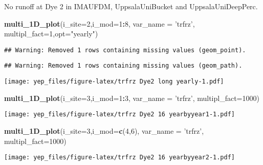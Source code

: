 \documentclass[]{article}
\newenvironment{Shaded}{\begin{snugshade}}{\end{snugshade}}
\newcommand{\DataTypeTok}[1]{\textcolor[rgb]{0.13,0.29,0.53}{#1}}
\newcommand{\DecValTok}[1]{\textcolor[rgb]{0.00,0.00,0.81}{#1}}
\newcommand{\KeywordTok}[1]{\textcolor[rgb]{0.13,0.29,0.53}{\textbf{#1}}}
\newcommand{\NormalTok}[1]{#1}
\newcommand{\OperatorTok}[1]{\textcolor[rgb]{0.81,0.36,0.00}{\textbf{#1}}}
\newcommand{\StringTok}[1]{\textcolor[rgb]{0.31,0.60,0.02}{#1}}
\begin{document}
No runoff at Dye 2 in IMAUFDM, UppsalaUniBucket and UppsalaUniDeepPerc.

\begin{Shaded}
\begin{Highlighting}[]
\KeywordTok{multi_1D_plot}\NormalTok{(}\DataTypeTok{i_site=}\DecValTok{2}\NormalTok{,}\DataTypeTok{i_mod=}\DecValTok{1}\OperatorTok{:}\DecValTok{8}\NormalTok{, }\DataTypeTok{var_name =} \StringTok{'trfrz'}\NormalTok{,  }\DataTypeTok{multipl_fact=}\DecValTok{1}\NormalTok{,}\DataTypeTok{opt=}\StringTok{"yearly"}\NormalTok{)  }
\end{Highlighting}
\end{Shaded}

\begin{verbatim}
## Warning: Removed 1 rows containing missing values (geom_point).
\end{verbatim}

\begin{verbatim}
## Warning: Removed 1 rows containing missing values (geom_path).
\end{verbatim}

\texttt{[image: yep\_files/figure-latex/trfrz Dye2 long yearly-1.pdf]}

\begin{Shaded}
\begin{Highlighting}[]
\KeywordTok{multi_1D_plot}\NormalTok{(}\DataTypeTok{i_site=}\DecValTok{3}\NormalTok{,}\DataTypeTok{i_mod=}\DecValTok{1}\OperatorTok{:}\DecValTok{3}\NormalTok{, }\DataTypeTok{var_name =} \StringTok{'trfrz'}\NormalTok{,  }\DataTypeTok{multipl_fact=}\DecValTok{1000}\NormalTok{)  }
\end{Highlighting}
\end{Shaded}

\texttt{[image: yep\_files/figure-latex/trfrz Dye2 16 yearbyyear1-1.pdf]}

\begin{Shaded}
\begin{Highlighting}[]
\KeywordTok{multi_1D_plot}\NormalTok{(}\DataTypeTok{i_site=}\DecValTok{3}\NormalTok{,}\DataTypeTok{i_mod=}\KeywordTok{c}\NormalTok{(}\DecValTok{4}\NormalTok{,}\DecValTok{6}\NormalTok{), }\DataTypeTok{var_name =} \StringTok{'trfrz'}\NormalTok{,  }\DataTypeTok{multipl_fact=}\DecValTok{1000}\NormalTok{)  }
\end{Highlighting}
\end{Shaded}

\texttt{[image: yep\_files/figure-latex/trfrz Dye2 16 yearbyyear2-1.pdf]}
\end{document}
